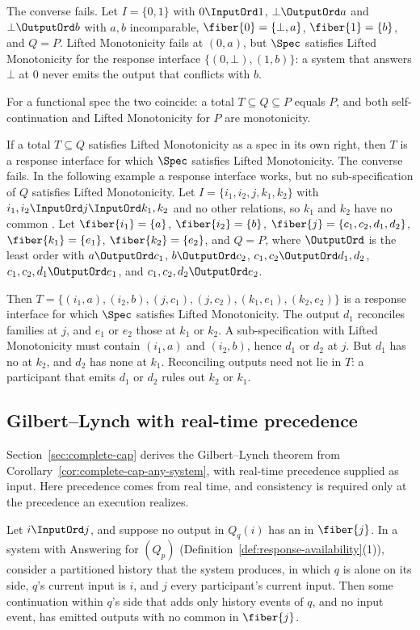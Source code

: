 The converse fails.  Let $I=\{0,1\}$ with $0\InputOrd 1$, $\bot\OutputOrd a$ and
$\bot\OutputOrd b$ with $a,b$ incomparable, $\fiber{0}=\{\bot,a\}$,
$\fiber{1}=\{b\}$, and $Q=P$.  Lifted Monotonicity fails at $(0,a)$, but $\Spec$
satisfies Lifted Monotonicity for the response interface $\{(0,\bot),(1,b)\}$: a system that
answers $\bot$ at $0$ never emits the output that conflicts with $b$.

For a functional spec the two coincide: a total $T\subseteq Q\subseteq
P$ equals $P$, and both self-continuation and Lifted Monotonicity for $P$ are
monotonicity.

If a total $T\subseteq Q$ satisfies Lifted Monotonicity as a spec in its own
right, then $T$ is a response interface for which $\Spec$ satisfies Lifted
Monotonicity.  The converse fails.  In the following example a response
interface works, but no sub-specification of $Q$ satisfies Lifted
Monotonicity.  Let $I=\{i_1,i_2,j,k_1,k_2\}$ with $i_1,i_2\InputOrd j\InputOrd
k_1,k_2$ and no other relations, so $k_1$ and $k_2$ have no common \indesc.
Let $\fiber{i_1}=\{a\}$, $\fiber{i_2}=\{b\}$, $\fiber{j}=\{c_1,c_2,d_1,d_2\}$,
$\fiber{k_1}=\{e_1\}$, $\fiber{k_2}=\{e_2\}$, and $Q=P$, where $\OutputOrd$ is
the least order with $a\OutputOrd c_1$, $b\OutputOrd c_2$, $c_1,c_2\OutputOrd
d_1,d_2$, $c_1,c_2,d_1\OutputOrd e_1$, and $c_1,c_2,d_2\OutputOrd e_2$.

Then $T=\{(i_1,a),(i_2,b),(j,c_1),(j,c_2),(k_1,e_1),(k_2,e_2)\}$ is a response
interface for which $\Spec$ satisfies Lifted Monotonicity.  The output $d_1$
reconciles families at $j$, and $e_1$ or $e_2$ those at $k_1$ or $k_2$.  A
sub-specification with Lifted Monotonicity must contain $(i_1,a)$ and
$(i_2,b)$, hence $d_1$ or $d_2$ at $j$.  But $d_1$ has no \outnoun at $k_2$,
and $d_2$ has none at $k_1$.  Reconciling outputs need not lie in $T$: a
participant that emits $d_1$ or $d_2$ rules out $k_2$ or $k_1$.

\subsection{Gilbert--Lynch with real-time precedence}

Section~\ref{sec:complete-cap} derives the Gilbert--Lynch theorem from
Corollary~\ref{cor:complete-cap-any-system}, with real-time precedence supplied
as input.  Here precedence comes from real time, and consistency is required
only at the precedence an execution realizes.

\begin{lemma}
\label{lem:forced-answer}
Let $i\InputOrd j$, and suppose no output in $Q_q(i)$ has an \outnoun in
$\fiber{j}$.  In a system with Answering for $(Q_p)$
(Definition~\ref{def:response-availability}(1)), consider a partitioned
history that the system produces, in which $q$ is alone on its side,
$q$'s current input is $i$, and $j$ \inrel every participant's current input.
Then some continuation within $q$'s side that adds only history events of $q$,
and no input event, has emitted outputs with no common \outnoun in
$\fiber{j}$.
\end{lemma}

